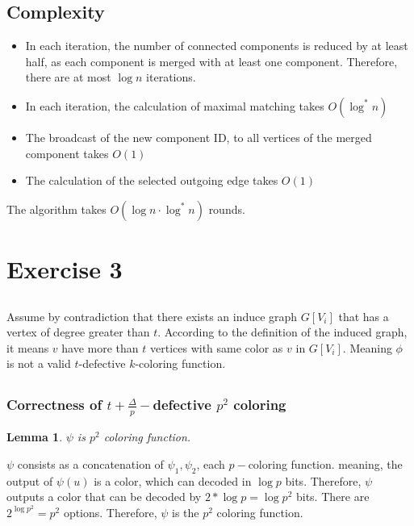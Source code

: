 \documentclass[11pt]{article}
\newtheorem{lemma}[theorem]{Lemma}
\begin{document}
\subsection*{Complexity}
\begin{itemize}
    \item In each iteration, the number of connected components is reduced by at least half, as each component is merged with at least one component. Therefore, there are at most $\log{n}$ iterations.
    \item In each iteration, the calculation of maximal matching takes $O(\log^{*}{n})$
    \item The broadcast of the new component ID, to all vertices of the merged component takes $O(1)$
    \item The calculation of the selected outgoing edge takes $O(1)$
\end{itemize}
The algorithm takes $O(\log{n} \cdot \log^{*}{n})$ rounds.

\section{Exercise 3}

\subsection{}
Assume by contradiction that there exists an induce graph $G[V_i]$ that has a vertex of degree greater than $t$. According to the definition of the induced graph, it means $v$ have more than $t$ vertices with same color as $v$ in $G[V_i]$. Meaning $\phi$ is not a valid $t$-defective $k$-coloring function.

\subsection{}

\subsubsection*{Correctness of $t + \frac{\Delta}{p}-$defective $p^2$ coloring}

\begin{lemma}
\label{psi_p2_coloring}
$\psi$ is $p^2$ coloring function.
\end{lemma}
$\psi$ consists as a concatenation of $\psi_1, \psi_2$, each $p-$coloring function. meaning, the output of $\psi(u)$ is a color, which can decoded in $\log{p}$ bits. Therefore, $\psi$ outputs a color that can be decoded by $2*\log{p}=\log{p^2}$ bits. There are $2^{\log{p^2}}=p^2$ options. Therefore, $\psi$ is the $p^2$ coloring function. 
\end{document}
